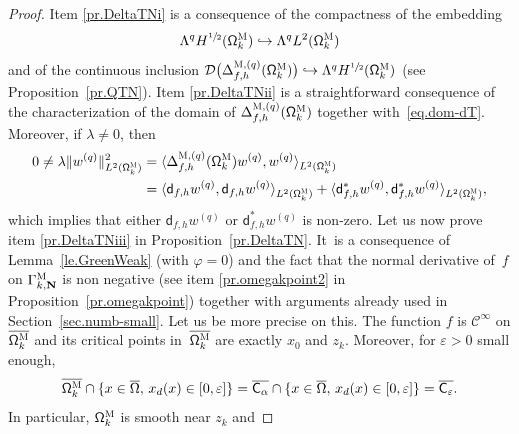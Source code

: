 \documentclass[10pt]{amsart}
\def\hto{\mathrel{\lhook\joinrel\to}}
\newcommand{\mbf}[1]{\mathbf{#1}}
\let\ve\varepsilon
\theoremstyle{plain}
\theoremstyle{definition}
\begin{document}
\begin{proof}
Item \eqref{pr.DeltaTNi} is a consequence of the compactness
of the embedding\vspace*{-3pt}\enlargethispage{\baselineskip}
\[
\Lambda^q H^{\sfrac12} (\mathsf \Omega_k^{\textsc{M}})\hto
\Lambda^qL^{2} (\mathsf \Omega_k^{\textsc{M}})
\]
and of the
continuous inclusion $\mathcal D\bigl(\Delta_{f,h}^{\textsc{M},(q)} (\mathsf \Omega_k^{\textsc{M}})\bigr) \hto
\Lambda^qH^{\sfrac12} (\mathsf \Omega_k^{\textsc{M}})$ (see Proposition~\ref{pr.QTN}).
Item \eqref{pr.DeltaTNii} is a straightforward consequence
of the characterization of the domain of $\Delta_{f,h}^{\textsc{M},(q)} (\mathsf \Omega_k^{\textsc{M}})$
together with~\eqref{eq.dom-dT}. Moreover, if
$\lambda\neq 0$, then\vspace*{-3pt}
\begin{align*}
0 \neq \lambda\Vert w_{}^{(q)}\Vert^2_{L^{2} (\mathsf \Omega_k^{\textsc{M}})}&= \langle \Delta_{f,h}^{\textsc{M},(q)} (\mathsf \Omega_k^{\textsc{M}})w_{}^{(q)},w_{}^{(q)}\rangle_{L^{2} (\mathsf \Omega_k^{\textsc{M}})}\\
&= \langle \mathsf d_{f,h} w^{(q)},\mathsf d_{f,h}w_{}^{(q)} \rangle_{L^{2} (\mathsf \Omega_k^{\textsc{M}})} +\langle \mathsf d^{*}_{f,h}w_{}^{(q)},\mathsf d^{*}_{f,h}w_{}^{(q)} \rangle_{L^{2} (\mathsf \Omega_k^{\textsc{M}})},
\end{align*}
which implies that either $\mathsf d_{f,h}w_{}^{(q)}$ or $\mathsf d^*_{f,h}w_{}^{(q)}$ is non-zero.
Let us now prove item \eqref{pr.DeltaTNiii} in Proposition~\ref{pr.DeltaTN}. It~is
a consequence of Lemma~\ref{le.GreenWeak} (with $\varphi=0$) and the
fact that the normal derivative of~$f$ on $\Gamma_{k,\mbf
N}^{\textsc{M}}$ is non negative (see item \ref{pr.omegakpoint2} in
Proposition~\ref{pr.omegakpoint}) together with arguments already used in Section~\ref{sec.numb-small}. Let us be more precise on this. The function $f$ is $\mathcal C^\infty$ on $\overline {\mathsf \Omega_k^{\textsc{M}}}$ and its critical points in~$\overline {\mathsf \Omega_k^{\textsc{M}}}$ are exactly $x_0$ and $z_k$.
Moreover, for $\ve >0$ small enough,\vspace*{-3pt}
\begin{equation}
\label{eq.=vec}
\overline {\mathsf \Omega_k^{\textsc{M}}}\cap \{x\in \overline \Omega,\, x_d(x) \in [0,\ve]\}= \overline {\mathsf C_\alpha }\cap \{x\in \overline \Omega,\, x_d(x)\in [0,\ve]\} =\overline {\mathsf C_\ve }.
\end{equation}
In particular, $ \mathsf \Omega_k^{\textsc{M}}$ is smooth near $z_k$ and\vspace*{-3pt}

\end{proof}
\end{document}
